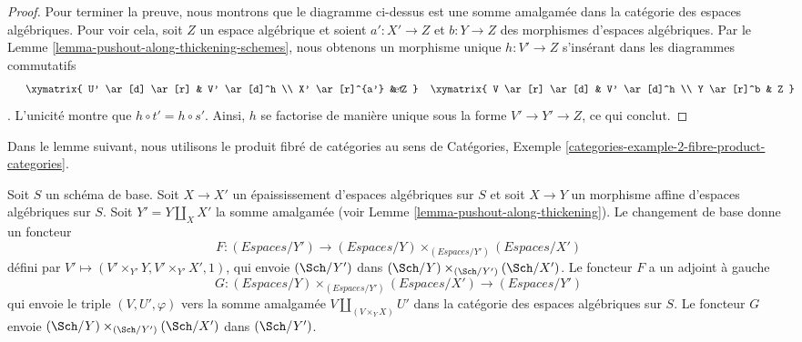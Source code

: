 \begin{proof}
\medskip\noindent
Pour terminer la preuve, nous montrons que le diagramme ci-dessus est une somme amalgamée dans la catégorie des espaces algébriques. Pour voir cela, soit $Z$ un espace algébrique et soient $a' : X' \to Z$ et $b : Y \to Z$ des morphismes d'espaces algébriques. Par le Lemme \ref{lemma-pushout-along-thickening-schemes}, nous obtenons un morphisme unique $h : V' \to Z$ s'insérant dans les diagrammes commutatifs $$
\vcenter{
\xymatrix{
U' \ar[d] \ar[r] & V' \ar[d]^h \\
X' \ar[r]^{a'} & Z
}
}
\quad\text{et}\quad
\vcenter{
\xymatrix{
V \ar[r] \ar[d] & V' \ar[d]^h \\
Y \ar[r]^b & Z
}
}
$$. L'unicité montre que $h \circ t' = h \circ s'$. Ainsi, $h$ se factorise de manière unique sous la forme $V' \to Y' \to Z$, ce qui conclut.
\end{proof}

\noindent
Dans le lemme suivant, nous utilisons le produit fibré de catégories au sens de
Catégories, Exemple \ref{categories-example-2-fibre-product-categories}.

\begin{lemma}
\label{lemma-categories-spaces-over-pushout}
Soit $S$ un schéma de base. Soit $X \to X'$ un épaississement d'espaces algébriques sur $S$ et soit $X \to Y$ un morphisme affine d'espaces algébriques sur $S$.
Soit $Y' = Y \amalg_X X'$ la somme amalgamée (voir
Lemme \ref{lemma-pushout-along-thickening}). Le changement de base donne un foncteur
$$
F :
(\textit{Espaces}/Y')
\longrightarrow
(\textit{Espaces}/Y) \times_{(\textit{Espaces}/Y')} (\textit{Espaces}/X')
$$
défini par $V' \longmapsto (V' \times_{Y'} Y, V' \times_{Y'} X', 1)$, qui
envoie $(\Sch/Y')$ dans $(\Sch/Y) \times_{(\Sch/Y')} (\Sch/X')$.
Le foncteur $F$ a un adjoint à gauche
$$
G :
(\textit{Espaces}/Y) \times_{(\textit{Espaces}/Y')} (\textit{Espaces}/X')
\longrightarrow
(\textit{Espaces}/Y')
$$
qui envoie le triple $(V, U', \varphi)$ vers la somme amalgamée
$V \amalg_{(V \times_Y X)} U'$ dans la catégorie des espaces algébriques sur $S$.
Le foncteur $G$ envoie $(\Sch/Y) \times_{(\Sch/Y')} (\Sch/X')$ dans $(\Sch/Y')$.
\end{lemma}

